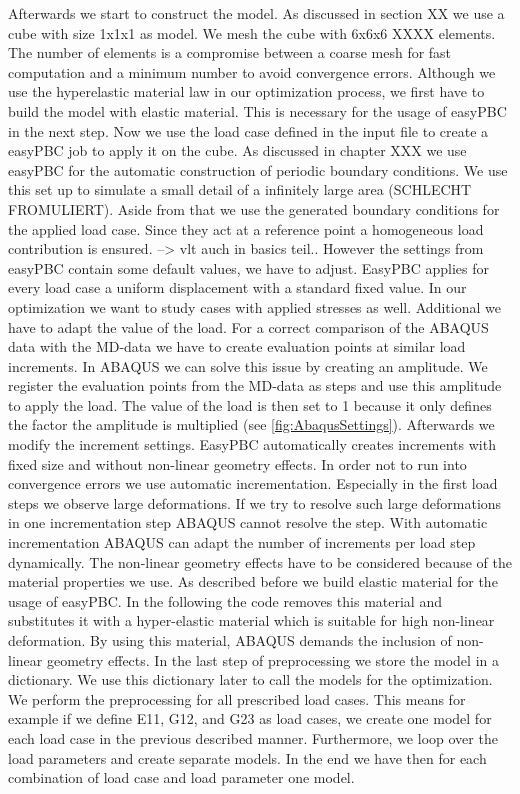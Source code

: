     Afterwards we start to construct the model. As discussed in section XX we use a cube with size 1x1x1 as model. We mesh the cube with 6x6x6 XXXX elements. The number of elements is a compromise between a coarse mesh for fast computation and a minimum number to avoid convergence errors. Although we use the hyperelastic material law in our optimization process, we first have to build the model with elastic material. This is necessary for the usage of easyPBC in the next step. Now we use the load case defined in the input file to create a easyPBC job to apply it on the cube. As discussed in chapter XXX we use easyPBC for the automatic construction of periodic boundary conditions. We use this set up to simulate a small detail of a infinitely large area (SCHLECHT FROMULIERT). Aside from that we use the generated boundary conditions for the applied load case. Since they act at a reference point a homogeneous load contribution is ensured. --> vlt auch in basics teil..
    However the settings from easyPBC contain some default values, we have to adjust. EasyPBC applies for every load case a uniform displacement with a standard fixed value. In our optimization we want to study cases with applied stresses as well. Additional we have to adapt the value of the load. For a correct comparison of the ABAQUS data with the MD-data we have to create evaluation points at similar load increments. In ABAQUS we can solve this issue by creating an amplitude. We register the evaluation points from the MD-data as steps and use this amplitude to apply the load. The value of the load is then set to 1 because it only defines the factor the amplitude is multiplied (see \autoref{fig:AbaqusSettings}). Afterwards we modify the increment settings. EasyPBC automatically creates increments with fixed size and without non-linear geometry effects. In order not to run into convergence errors we use automatic incrementation. Especially in the first load steps we observe large deformations. If we try to resolve such large deformations in one incrementation step ABAQUS cannot resolve the step. With automatic incrementation ABAQUS can adapt the number of increments per load step dynamically. The non-linear geometry effects have to be considered because of the material properties we use. As described before we build elastic material for the usage of easyPBC. In the following the code removes this material and substitutes it with a hyper-elastic material which is suitable for high non-linear deformation. By using this material, ABAQUS demands the inclusion of non-linear geometry effects. In the last step of preprocessing we store the model in a dictionary. We use this dictionary later to call the models for the optimization. We perform the preprocessing for all prescribed load cases. This means for example if we define E11, G12, and G23 as load cases, we create one model for each load case in the previous described manner. Furthermore, we loop over the load parameters and create separate models. In the end we have then for each combination of load case and load parameter one model. 

